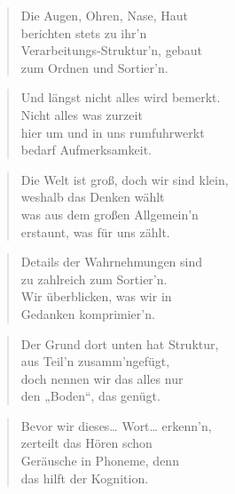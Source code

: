 \documentclass[10pt,a4paper]{article}
\begin{document}
\begin{multicols}{2}
\begin{verse}
Die Augen, Ohren, Nase, Haut \\
berichten stets zu ihr’n \\
Verarbeitungs-Struktur’n, gebaut \\
zum Ordnen und Sortier’n. \\
\end{verse}

\begin{verse}
Und längst nicht alles wird bemerkt. \\
Nicht alles was zurzeit \\
hier um und in uns rumfuhrwerkt \\
bedarf Aufmerksamkeit. \\
\end{verse}

\begin{verse}
Die Welt ist groß, doch wir sind klein, \\
weshalb das Denken wählt \\
was aus dem großen Allgemein’n \\
erstaunt, was für uns zählt. \\
\end{verse}

\begin{verse}
Details der Wahrnehmungen sind \\
zu zahlreich zum Sortier’n. \\
Wir überblicken, was wir in \\
Gedanken komprimier’n. \\
\end{verse}

\begin{verse}
Der Grund dort unten hat Struktur, \\
aus Teil’n zusamm’ngefügt, \\
doch nennen wir das alles nur \\
den „Boden“, das genügt. \\
\end{verse}

\begin{verse}
Bevor wir dieses… Wort… erkenn’n, \\
zerteilt das Hören schon \\
Geräusche in Phoneme, denn \\
das hilft der Kognition. \\
\end{verse}


\end{multicols}
\end{document}
